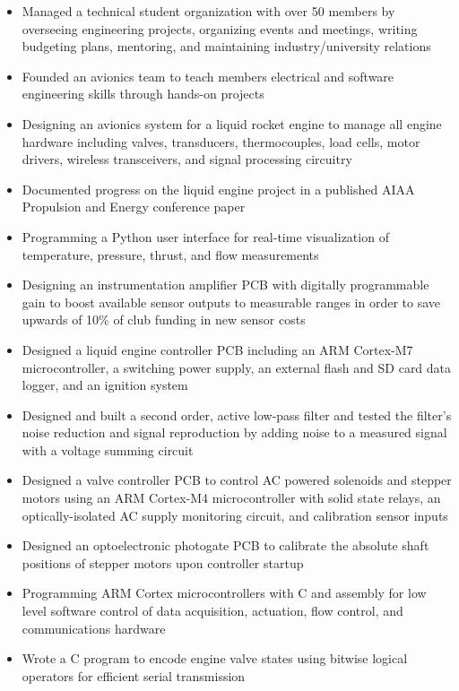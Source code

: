\documentclass{article}
\begin{document}
\begin{itemize}
\item{Managed a technical student organization with over 50 members by overseeing engineering projects, organizing events and meetings, writing budgeting plans, mentoring, and maintaining industry/university relations}
\item{Founded an avionics team to teach members electrical and software engineering skills through hands-on projects}
	\item{Designing an avionics system for a liquid rocket engine to manage all engine hardware including valves, transducers, thermocouples, load cells, motor drivers, wireless transceivers, and signal processing circuitry}
	\item{Documented progress on the liquid engine project in a published AIAA Propulsion and Energy conference paper}
	\item{Programming a Python user interface for real-time visualization of temperature, pressure, thrust, and flow measurements}
	\item{Designing an instrumentation amplifier PCB with digitally programmable gain to boost available sensor outputs to measurable ranges in order to save upwards of 10\% of club funding in new sensor costs}
\item{Designed a liquid engine controller PCB including an ARM Cortex-M7 microcontroller, a switching power supply, an external flash and SD card data logger, and an ignition system}
	\item{Designed and built a second order, active low-pass filter and tested the filter's noise reduction and signal reproduction by adding noise to a measured signal with a voltage summing circuit}
\item{Designed a valve controller PCB to control AC powered solenoids and stepper motors using an ARM Cortex-M4 microcontroller with solid state relays, an optically-isolated AC supply monitoring circuit, and calibration sensor inputs}
	\item{Designed an optoelectronic photogate PCB to calibrate the absolute shaft positions of stepper motors upon controller startup}
	\item{Programming ARM Cortex microcontrollers with C and assembly for low level software control of data acquisition, actuation, flow control, and communications hardware}
	\item{Wrote a C program to encode engine valve states using bitwise logical operators for efficient serial transmission}
\end{itemize}
\thispagestyle{empty}
\end{document}
